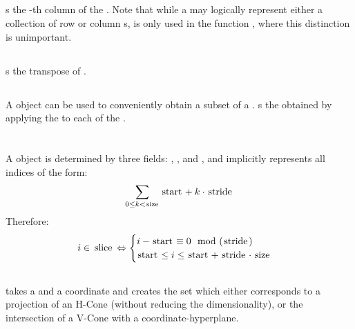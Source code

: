 \subsection{}
 s the -th column of the .  Note that while a  may logically represent either a collection of row or column s,  is only used in the function , where this distinction is unimportant.
\lstgetcolumn

\subsection{}
 s the transpose of .
\lsttranspose

\subsection{}
A  object can be used to conveniently obtain a subset of a .   s the  obtained by applying the  to each  of the .
\lstslicematrix

\section{}

\subsection{}
A  object is determined by three fields: , , and , and implicitly represents all indices of the form:
\[ \sum_{0 \leq k < \mli{size}} \mli{start} + k\cdot\mli{stride} \]
Therefore:
\[i \in \mli{slice} \Leftrightarrow
	\begin{cases}
		i - \mli{start} \equiv 0 \mod(\mli{stride}) \\
		\mli{start} \leq i \leq \mli{start} + {\mli{stride}}\cdot\mli{size}
	\end{cases}\]
\lstindexinslice

\subsection{}
 takes a  and a coordinate  and creates the set which either corresponds to a projection of an H-Cone (without reducing the dimensionality), or the intersection of a V-Cone with a coordinate-hyperplane.
\lstfouriermotzkin

